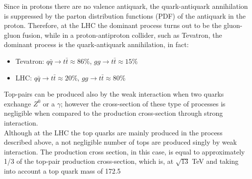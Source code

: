 \newline Since in protons there are no valence antiquark, the quark-antiquark annihilation is suppressed by 
the parton distribution functions (PDF) of the antiquark in the proton. Therefore, at the LHC the dominant process turns out to be the
gluon-gluon fusion, while in a proton-antiproton collider, such as Tevatron,
the dominant process is the quark-antiquark annihilation, in fact:
\begin{itemize}
	\item Tevatron: $q\bar{q}\rightarrow t\bar{t} \approx 86\%$, $gg\rightarrow t\bar{t} \approx 15\%$
	\item LHC: $q\bar{q}\rightarrow t\bar{t} \approx 20\%$, $gg\rightarrow t\bar{t} \approx 80\%$
\end{itemize}
Top-pairs can be produced also by the weak interaction when two quarks exchange $Z^0$ or a $\gamma$; however the cross-section of these
type of processes is negligible when compared to the production cross-section through strong interaction.\\
Although at the LHC the top quarks are mainly produced in the process described above, a not negligible number of tops 
are produced singly by weak interaction. The production cross section, in this case, is equal to approximately 1/3 of the top-pair production
cross-section, which is, at $\sqrt{13}$ TeV and taking into account a top quark mass of 172.5 \\

